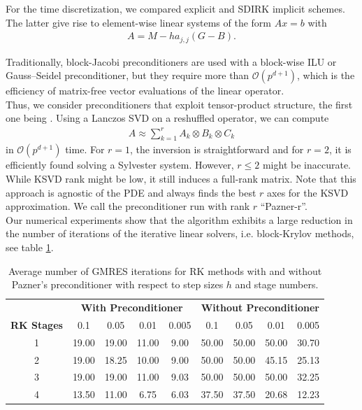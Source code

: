 \documentclass[12pt]{report}
\theoremstyle{remark}
\begin{document}
For the time discretization, we compared explicit and SDIRK implicit schemes. The latter give rise to element-wise linear systems of the form $A x = b$ with
\begin{align}
A = M - h a_{j,j} (G - B).
\end{align}

Traditionally, block-Jacobi preconditioners are used with a block-wise ILU or Gauss--Seidel preconditioner, but they require more than $\mathcal{O}(p^{d+1})$, which is the efficiency of matrix-free vector evaluations of the linear operator. \\

Thus, we consider preconditioners that exploit tensor-product structure, the first one being \cite{pazner2018approximate}. Using a Lanczos SVD on a reshuffled operator, we can compute 
\begin{align}
A \approx \sum_{k=1}^r A_k \otimes B_k \otimes C_k
\end{align}
in $\mathcal{O}(p^{d+1})$ time. For $r = 1$, the inversion is straightforward and for $r = 2$, it is efficiently found solving a Sylvester system. However, $r \leq 2$ might be inaccurate. While KSVD rank might be low, it still induces a full-rank matrix. Note that this approach is agnostic of the PDE and always finds the best $r$ axes for the KSVD approximation. We call the preconditioner run with rank $r$ ``Pazner-r''. \\

Our numerical experiments show that the algorithm exhibits a large reduction in the number of iterations of the iterative linear solvers, i.e. block-Krylov methods, see table \ref{tab:iterations}. \\

\begin{table}[h!]
\centering
\begin{tabular}{c|cccc|cccc}
\hline
 & \multicolumn{4}{c|}{\textbf{With Preconditioner}} 
 & \multicolumn{4}{c}{\textbf{Without Preconditioner}} \\
\textbf{RK Stages} 
& 0.1 & 0.05 & 0.01 & 0.005 
& 0.1 & 0.05 & 0.01 & 0.005 \\
\hline
1 & 19.00 & 19.00 & 11.00 & 9.00 
  & 50.00 & 50.00 & 50.00 & 30.70 \\
2 & 19.00 & 18.25 & 10.00 & 9.00 
  & 50.00 & 50.00 & 45.15 & 25.13 \\
3 & 19.00 & 19.00 & 11.00 & 9.03 
  & 50.00 & 50.00 & 50.00 & 32.25 \\
4 & 13.50 & 11.00 & 6.75 & 6.03 
  & 37.50 & 37.50 & 20.68 & 12.23 \\
\hline
\end{tabular}
\caption{Average number of GMRES iterations for RK methods with and without Pazner's preconditioner with respect to step sizes $h$ and stage numbers.}
\label{tab:iterations}
\end{table}
\end{document}
